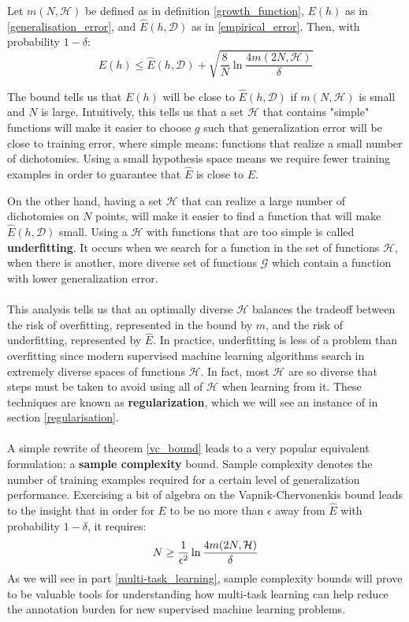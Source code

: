 \begin{theorem}
	\label{vc_bound}
	Let $m(N, \mathcal{H})$ be defined as in definition \ref{growth_function}, $E(h)$ as in \ref{generalisation_error}, and $\hat{E}(h, \mathcal{D})$ as in \ref{empirical_error}. Then, with probability $1 - \delta$:
	$$
	E(h) \leq \hat{E}(h, \mathcal{D}) + \sqrt{\frac{8}{N}\ln \frac{4m(2N, \mathcal{H})}{\delta}}
	$$
\end{theorem}
\noindent
The bound tells us that $E(h)$ will be close to $\hat{E}(h, \mathcal{D})$ if $m(N, \mathcal{H})$ is small and $N$ is large. Intuitively, this tells us that a set $\mathcal{H}$ that contains "simple" functions will make it easier to choose $g$ such that generalization error will be close to training error, where simple means: functions that realize a small number of dichotomies. Using a small hypothesis space means we require fewer training examples in order to guarantee that $\hat{E}$ is close to $E$.

On the other hand, having a set $\mathcal{H}$ that can realize a large number of dichotomies on $N$ points, will make it easier to find a function that will make $\hat{E}(h, \mathcal{D})$ small. Using a $\mathcal{H}$ with functions that are too simple is called \textbf{underfitting}. It occurs when we search for a function in the set of functions $\mathcal{H}$, when there is another, more diverse set of functions $\mathcal{G}$ which contain a function with lower generalization error.
\\\\
This analysis tells us that an optimally diverse $\mathcal{H}$ balances the tradeoff between the risk of overfitting, represented in the bound by $m$, and the risk of underfitting, represented by $\hat{E}$. In practice, underfitting is less of a problem than overfitting since modern supervised machine learning algorithms search in extremely diverse spaces of functions $\mathcal{H}$. In fact, most $\mathcal{H}$ are so diverse that steps must be taken to avoid using all of $\mathcal{H}$ when learning from it. These techniques are known as \textbf{regularization}, which we will see an instance of in section \ref{regularisation}.
\\\\
A simple rewrite of theorem \ref{vc_bound} leads to a very popular equivalent formulation: a \textbf{sample complexity} bound. Sample complexity denotes the number of training examples required for a certain level of generalization performance. Exercising a bit of algebra on the Vapnik-Chervonenkis bound leads to the insight that in order for $E$ to be no more than $\epsilon$ away from $\hat{E}$ with probability $1 - \delta$, it requires:
$$
N \geq \frac{1}{\epsilon^2}\ln \frac{4m(2N, \mathcal{H})}{\delta}
$$
As we will see in part \ref{multi-task_learning}, sample complexity bounds will prove to be valuable tools for understanding how multi-task learning can help reduce the annotation burden for new supervised machine learning problems.

